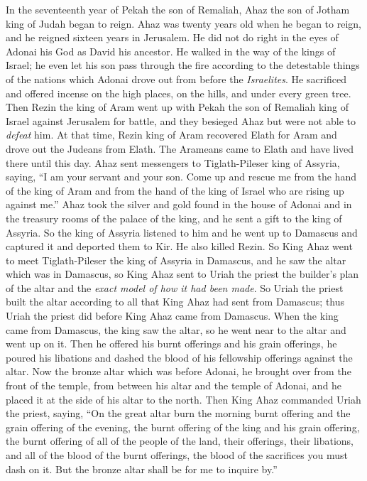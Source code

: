 \begin{biblechapter} %
 In the seventeenth year of Pekah the son of Remaliah, Ahaz the son of Jotham king of Judah began to reign.
\verse Ahaz was twenty years old when he began to reign, and he reigned sixteen years in Jerusalem. He did not do right in the eyes of Adonai his God as David his ancestor.
\verse He walked in the way of the kings of Israel; he even let his son pass through the fire according to the detestable things of the nations which Adonai drove out from before the \textit{Israelites}.
\verse He sacrificed and offered incense on the high places, on the hills, and under every green tree.
\verse Then Rezin the king of Aram went up with Pekah the son of Remaliah king of Israel against Jerusalem for battle, and they besieged Ahaz but were not able to \textit{defeat} him.
\verse At that time, Rezin king of Aram recovered Elath for Aram and drove out the Judeans from Elath. The Arameans came to Elath and have lived there until this day.
\verse Ahaz sent messengers to Tiglath-Pileser king of Assyria, saying, “I am your servant and your son. Come up and rescue me from the hand of the king of Aram and from the hand of the king of Israel who are rising up against me.”
\verse Ahaz took the silver and gold found in the house of Adonai and in the treasury rooms of the palace of the king, and he sent a gift to the king of Assyria.
\verse So the king of Assyria listened to him and he went up to Damascus and captured it and deported them to Kir. He also killed Rezin.
 So King Ahaz went to meet Tiglath-Pileser the king of Assyria in Damascus, and he saw the altar which was in Damascus, so King Ahaz sent to Uriah the priest the builder’s plan of the altar and the \textit{exact model of how it had been made}.
\verse So Uriah the priest built the altar according to all that King Ahaz had sent from Damascus; thus Uriah the priest did before King Ahaz came from Damascus.
\verse When the king came from Damascus, the king saw the altar, so he went near to the altar and went up on it.
\verse Then he offered his burnt offerings and his grain offerings, he poured his libations and dashed the blood of his fellowship offerings against the altar.
\verse Now the bronze altar which was before Adonai, he brought over from the front of the temple, from between his altar and the temple of Adonai, and he placed it at the side of his altar to the north.
\verse Then King Ahaz commanded Uriah the priest, saying, “On the great altar burn the morning burnt offering and the grain offering of the evening, the burnt offering of the king and his grain offering, the burnt offering of all of the people of the land, their offerings, their libations, and all of the blood of the burnt offerings, the blood of the sacrifices you must dash on it. But the bronze altar shall be for me to inquire by.”

\end{biblechapter}
